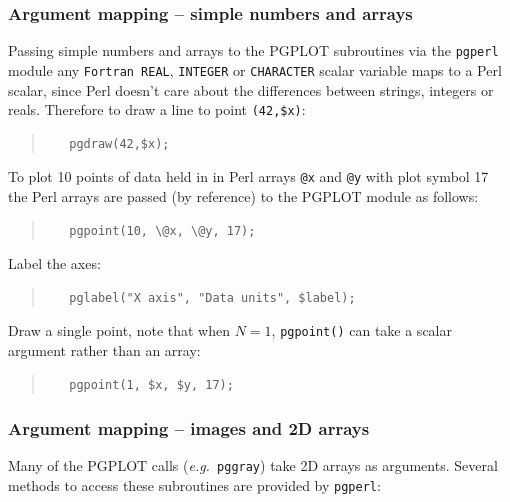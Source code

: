 \documentclass[twoside,11pt]{article}
\begin{document}
\subsubsection{Argument mapping -- simple numbers and arrays}

Passing simple numbers and arrays to the PGPLOT subroutines via the {\tt pgperl} module any {\tt Fortran REAL}, {\tt INTEGER} or {\tt CHARACTER} scalar variable maps to a Perl scalar, since Perl doesn't care about the differences between strings, integers or reals. Therefore to draw a line to point \verb+(42,$x)+:

\small
\begin{quote}
\begin{verbatim}
   pgdraw(42,$x); 
\end{verbatim}
\end{quote}
\normalsize

To plot 10 points of data held in in Perl arrays {\tt @x} and {\tt @y} with plot symbol 17 the Perl arrays are passed (by reference) to the PGPLOT module as follows:

\small
\begin{quote}
\begin{verbatim}
   pgpoint(10, \@x, \@y, 17);
\end{verbatim}
\end{quote}
\normalsize

 
Label the axes: 

\small
\begin{quote}
\begin{verbatim}
   pglabel("X axis", "Data units", $label);
\end{verbatim}
\end{quote}
\normalsize

Draw a single point, note that when $N=1$, {\tt pgpoint()} can take a scalar argument rather than an array:

\small
\begin{quote}
\begin{verbatim}
   pgpoint(1, $x, $y, 17);
\end{verbatim}
\end{quote}
\normalsize

\subsubsection{Argument mapping -- images and 2D arrays}

Many of the PGPLOT calls ({\em e.g.\ }{\tt pggray}) take 2D arrays as arguments. Several methods to access these subroutines are provided by {\tt pgperl}:
\end{document}

